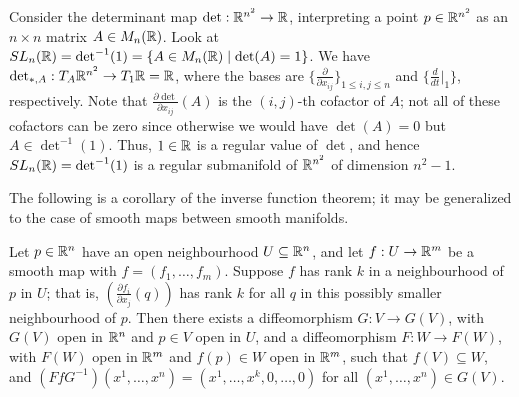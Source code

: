 \begin{example}
    Consider the determinant map $\det:\mathbb{R}^{n^{2}} \to \mathbb{R}$, interpreting a point $p \in \mathbb{R}^{n^{2}}$ as an $n \times n$ matrix $A \in M_{n}(\mathbb{R})$. Look at $SL_{n}(\mathbb{R}) = \det^{-1}(1) = \{A \in M_{n}(\mathbb{R}) \mid \det(A) = 1\}$. We have $\det_{\ast,A}:T_{A}\mathbb{R}^{n^{2}} \to T_{1}\mathbb{R} = \mathbb{R}$, where the bases are $\{\frac{\partial}{\partial x_{ij}}\}_{1 \leq i,j \leq n}$ and $\{\frac{d}{dt}|_{1}\}$, respectively. Note that $\frac{\partial \det}{\partial x_{ij}}(A)$ is the $(i,j)$-th cofactor of $A$; not all of these cofactors can be zero since otherwise we would have $\det(A) = 0$ but $A \in \det^{-1}(1)$. Thus, $1 \in \mathbb{R}$ is a regular value of $\det$, and hence $SL_{n}(\mathbb{R}) = \det^{-1}(1)$ is a regular submanifold of $\mathbb{R}^{n^{2}}$ of dimension $n^{2}-1$.
\end{example}


The following is a corollary of the inverse function theorem; it may be generalized to the case of smooth maps between smooth manifolds.

\begin{corollary}
    Let $p \in \mathbb{R}^{n}$ have an open neighbourhood $U \subseteq \mathbb{R}^{n}$, and let $f:U \to \mathbb{R}^{m}$ be a smooth map with $f = (f_{1},\ldots,f_{m})$. Suppose $f$ has rank $k$ in a neighbourhood of $p$ in $U$; that is, $\left(\frac{\partial f_{i}}{\partial x_{j}}(q)\right)$ has rank $k$ for all $q$ in this possibly smaller neighbourhood of $p$. Then there exists a diffeomorphism $G:V \to G(V)$, with $G(V)$ open in $\mathbb{R}^{n}$ and $p \in V$ open in $U$, and a diffeomorphism $F:W \to F(W)$, with $F(W)$ open in $\mathbb{R}^{m}$ and $f(p) \in W$ open in $\mathbb{R}^{m}$, such that $f(V) \subseteq W$, and $(FfG^{-1})(x^{1},\ldots,x^{n}) = (x^{1},\ldots,x^{k},0,\ldots,0)$ for all $(x^{1},\ldots,x^{n}) \in G(V)$.    
\end{corollary}

